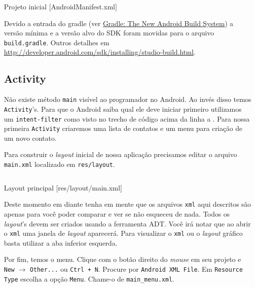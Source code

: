 \begin{listing}[H]
  \inputminted[linenos=true,frame=bottomline,tabsize=3]{ xml }{ source/AndroidManifest-1.xml }
  \caption{Projeto inicial [AndroidManifest.xml]}
  \label{code:android-manifest-1}
\end{listing}

Devido a entrada do \gls{gradle} (ver
\href{http://www.gradleware.com/android/gradle-the-new-android-build-system/}{Gradle:
The New Android Build System}) a versão mínima e a versão alvo do SDK
foram movidas para o arquivo \texttt{build.gradle}. Outros detalhes em
\url{http://developer.android.com/sdk/installing/studio-build.html}.

\subsection{Activity \label{ssec:act}}

Não existe método \texttt{main} visível ao programador no Android. Ao
invés disso temos \texttt{Activity}'s. Para que o Android saiba qual ele
deve iniciar primeiro utilizamos um \texttt{intent-filter} como visto no
trecho de código acima da linha  a . Para nossa
primeira \texttt{Activity} criaremos uma lista de contatos e um menu
para criação de um novo contato.

Para construir o \emph{layout} inicial de nossa aplicação precisamos
editar o arquivo \texttt{main.xml} localizado em \texttt{res/layout}.

\begin{listing}[H]
  \inputminted[linenos=true,frame=bottomline,tabsize=3]{ xml }{ source/main-1.xml }
  \caption{Layout principal [res/layout/main.xml]}
\end{listing}

Deste momento em diante tenha em mente que os arquivos \texttt{xml} aqui
descritos são apenas para você poder comparar e ver se não esqueceu de
nada. Todos os \emph{layout}'s devem ser criados usando a ferramenta
ADT. Você irá notar que ao abrir o \texttt{xml} uma janela de
\emph{layout} aparecerá. Para visualizar o \texttt{xml} ou o
\emph{layout} gráfico basta utilizar a aba inferior esquerda.

Por fim, temos o menu. Clique com o botão direito do \emph{mouse} em seu
projeto e \texttt{New} $\rightarrow$ \texttt{Other...} ou
\texttt{Ctrl + N}. Procure por \texttt{Android XML File}. Em
\texttt{Resource Type} escolha a opção \texttt{Menu}. Chame-o de
\texttt{main\_menu.xml}.

